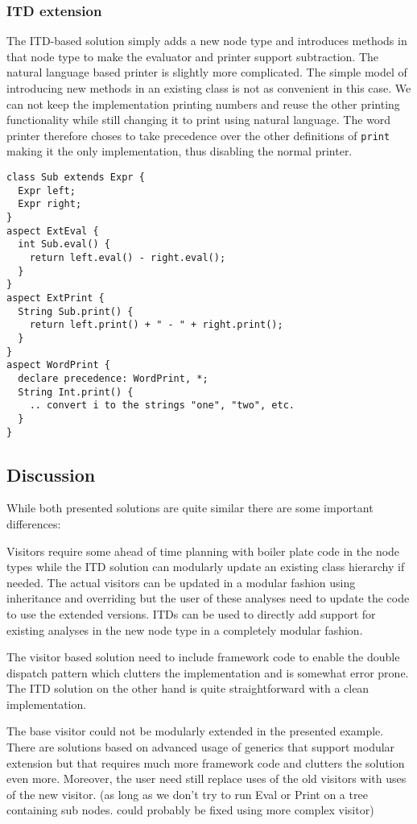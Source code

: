 \subsubsection{ITD extension}
The ITD-based solution simply adds a new node type and introduces methods in that
node type to make the evaluator and printer support subtraction.
The natural language based printer is slightly more complicated. The simple
model of introducing new methods in an existing class is not as convenient
in this case. We can not keep the implementation printing numbers and reuse
the other printing functionality while still changing it to print using
natural language. The word printer therefore choses to take precedence over
the other definitions of \texttt{print} making it the only implementation, thus
disabling the normal printer.

\begin{lstlisting}[caption={ITD Extension}]
class Sub extends Expr {
  Expr left;
  Expr right;
}
aspect ExtEval {
  int Sub.eval() {
    return left.eval() - right.eval();
  }
}
aspect ExtPrint {
  String Sub.print() {
    return left.print() + " - " + right.print(); 
  }
}
aspect WordPrint {
  declare precedence: WordPrint, *;
  String Int.print() {
    .. convert i to the strings "one", "two", etc.
  }
}
\end{lstlisting}

\subsection{Discussion}
While both presented solutions are quite similar there are some important
differences:

Visitors require some ahead of time planning with boiler plate code in the 
node types while the ITD solution can modularly update an existing class 
hierarchy if needed. The actual visitors can be updated in a 
modular fashion using inheritance and overriding but the user of these 
analyses need to update the code to use the extended versions. ITDs can 
be used to directly add support for existing analyses in the new node type 
in a completely modular fashion. 

The visitor based solution need to include framework code to enable the 
double dispatch pattern which clutters the implementation and is somewhat 
error prone. The ITD solution on the other hand is quite 
straightforward with a clean implementation.

The base visitor could not be modularly extended in the presented example.
There are solutions based on advanced usage of generics that support
modular extension but that requires much more framework code and clutters
the solution even more. Moreover, the user need still replace uses of the
old visitors with uses of the new visitor.
(as long as we don't try to run Eval
or Print on a tree containing sub nodes. could probably be fixed using more
complex visitor)

